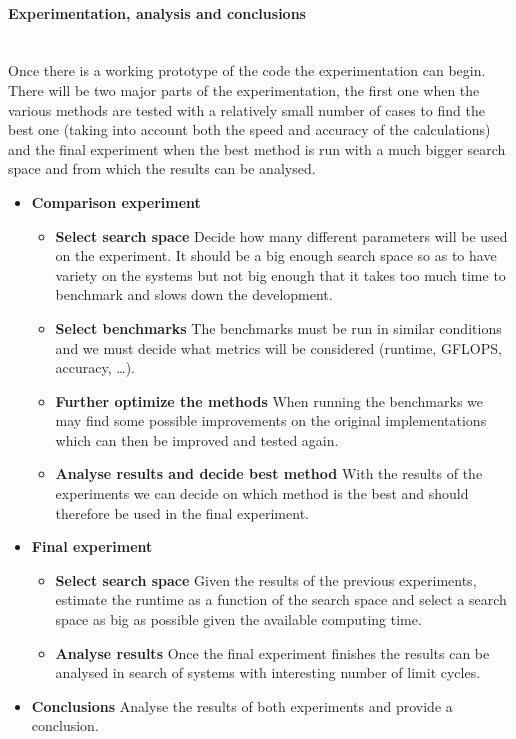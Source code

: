 \paragraph{Experimentation, analysis and conclusions}\mbox{}\\

Once there is a working prototype of the code the experimentation can begin.
There will be two major parts of the experimentation, the first one when the
various methods are tested with a relatively small number of cases to find the
best one (taking into account both the speed and accuracy of the calculations)
and the final experiment when the best method is run with a much bigger search
space and from which the results can be analysed.

\begin{itemize}
    \item \textbf{Comparison experiment}
        \begin{itemize}
            \item \textbf{Select search space} Decide how many different
                parameters will be used on the experiment. It should be a big
                enough search space so as to have variety on the systems but not
                big enough that it takes too much time to benchmark and slows
                down the development.
            \item \textbf{Select benchmarks} The benchmarks must be run in
                similar conditions and we must decide what metrics will be
                considered (runtime, GFLOPS, accuracy, \dots).
            \item \textbf{Further optimize the methods} When running the
                benchmarks we may find some possible improvements on the
                original implementations which can then be improved and tested
                again.
            \item \textbf{Analyse results and decide best method} With the
                results of the experiments we can decide on which method is the
                best and should therefore be used in the final experiment.
        \end{itemize}
    \item \textbf{Final experiment}
        \begin{itemize}
            \item \textbf{Select search space} Given the results of the previous
                experiments, estimate the runtime as a function of the search
                space and select a search space as big as possible given the
                available computing time.
            \item \textbf{Analyse results} Once the final experiment finishes
                the results can be analysed in search of systems with
                interesting number of limit cycles.
        \end{itemize}
    \item \textbf{Conclusions} Analyse the results of both experiments and
        provide a conclusion.
\end{itemize}

